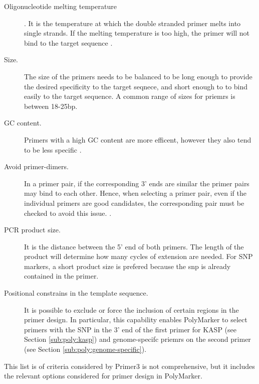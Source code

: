 \begin{description}
    \item[Oligonucleotide melting temperature]. It is the temperature at which the double stranded primer melts into single strands. If the melting temperature is too high, the primer will not bind to the target sequence \citep{Breslauer1986}.
    \item[Size.] The size of the primers needs to be balanced to be long enough to provide the desired specificity to the target seqnece, and short enough to to bind easily to the target sequence. A common range of sizes for priemrs is between 18-25bp. 
    \item[GC content.] Primers with a high GC content are more efficent, however they also tend to be less specific \citep{Rychlik1995}.
    \item[Avoid primer-dimers.] In a primer pair, if the corresponding 3' ends are similar the primer pairs may bind to each other. Hence, when selecting a primer pair, even if the individual primers are good candidates, the corresponding pair must be checked to avoid this issue. \citep{Chou1992}.
    \item[PCR product size.] It is the distance between the 5' end of both primers. The length of the product will determine how many cycles of extension are needed. For SNP markers, a short product size is prefered because the snp is already contained in the primer. 
    \item[Positional constrains in the template sequence.] It is possible to exclude or force the inclusion of certain regions in the primer design. In particular, this capability enables PolyMarker to select primers with the SNP in the 3' end of the first primer for KASP (see Section \ref{sub:poly:kasp}) and genome-specifc priemrs on the second primer (see Section \ref{sub:poly:genome-specific}). 
\end{description}
This list is of criteria considered by Primer3 is not comprehensive, but it includes the relevant options considered for primer design in PolyMarker. 


